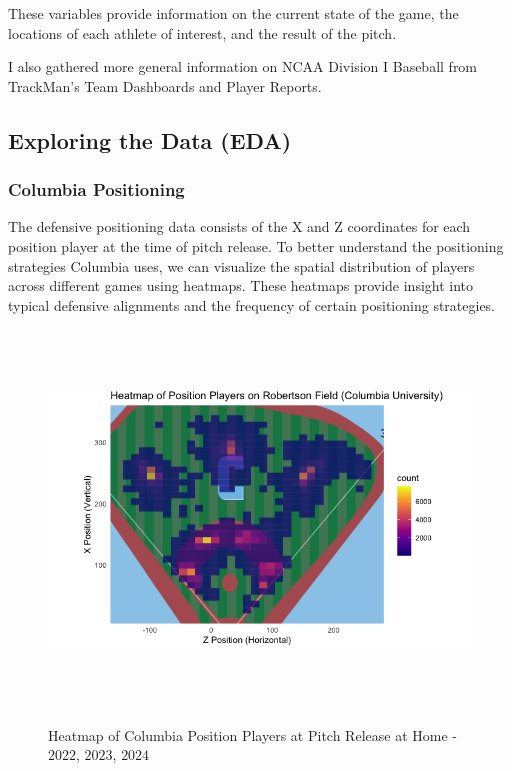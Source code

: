 \documentclass{article}
\begin{document}
These variables provide information on the current state of the game, the locations of each athlete of interest, and the result of the pitch. 

I also gathered more general information on NCAA Division I Baseball from TrackMan's Team Dashboards and Player Reports. \cite{trackman2022} \cite{trackman2023} \cite{trackman2024} \cite{trackman2023baseball}


\subsection{Exploring the Data (EDA)}

\subsubsection{Columbia Positioning}

The defensive positioning data consists of the X and Z coordinates for each position player at the time of pitch release. To better understand the positioning strategies Columbia uses, we can visualize the spatial distribution of players across different games using heatmaps. These heatmaps provide insight into typical defensive alignments and the frequency of certain positioning strategies.

\vspace{1cm}
\begin{figure}[h]
    \centering        
    \includegraphics[height=10cm]{images/player_heatmap.png}
    \caption{Heatmap of Columbia Position Players at Pitch Release at Home - $2022$, $2023$, $2024$}
    \cite{trackman2022} \cite{trackman2023} \cite{trackman2024} \cite{albert2023analyzing}
\end{figure}
\vspace{1cm}
\end{document}
